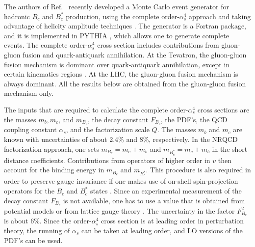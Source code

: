 The authors of Ref.~\cite{Chang:2003cq} recently developed a Monte
Carlo event generator for hadronic $B_c$ and $B^*_c$ production,
using the complete order-$\alpha_s^4$ approach and taking advantage
of helicity amplitude techniques \cite{Mangano:1990by}. The generator
is a Fortran package, and  it is implemented in PYTHIA
\cite{Sjostrand:1993yb}, which allows one to generate complete events.
The complete order-$\alpha_s^4$ cross section includes contributions
from gluon-gluon fusion and  quark-antiquark annihilation. At the
Tevatron, the gluon-gluon fusion mechanism is dominant over 
quark-antiquark annihilation, except in certain kinematics regions
\cite{Chang:1992jb,Chang:2003cr}. At the LHC, the gluon-gluon fusion
mechanism is always dominant. All the results below are obtained
from the gluon-gluon fusion mechanism only.

The inputs that are required to calculate the complete
order-$\alpha_s^4$ cross sections are the masses $m_b, m_c$, and
$m_{B_c}$, the decay constant $F_{B_c}$, the PDF's, the QCD coupling
constant $\alpha_s$, and the factorization scale $Q$. The masses $m_b$
and $m_c$ are known with uncertainties of about 2.4\% and 8\%,
respectively.  In the NRQCD factorization approach, one sets $m_{B_c} =
m_c+m_b$ and $m_{B_c^*} = m_c+m_b$ in the short-distance coefficients.
Contributions from operators of higher order in $v$ then account for the
binding energy in $m_{B_c}$ and $m_{B_c^*}$. This procedure is also
required in order to preserve gauge invariance if one makes use of
on-shell spin-projection operators for the $B_c$ and $B_c^*$ states
\cite{Chang:1979nn,Guberina:1980fn}. Since an experimental measurement
of the decay constant $F_{B_c}$ is not available, one has to use a value
that is obtained from potential models
\cite{Chen:fq,Eichten:1994gt,Kiselev:1994rc,AbdEl-Hady:1999xh} or from
lattice gauge theory \cite{Davies:1996gi}. The uncertainty in the factor
$F_{B_c}^2$ is about 6\%. Since the order-$\alpha_s^4$ cross section is
at leading order in perturbation theory, the running of $\alpha_s$ can
be taken at leading order, and LO versions of the PDF's can be used.


